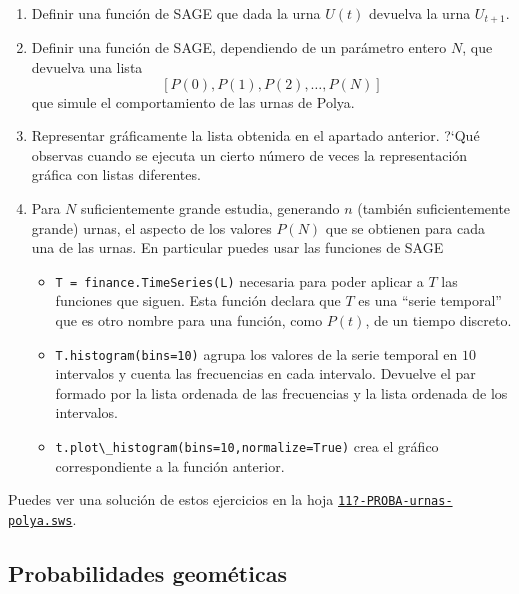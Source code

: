\begin{ejer}
\begin{enumerate}
 \item Definir una funci\'on de SAGE que dada la urna $U(t)$ devuelva la urna
$U_{t+1}$.
 
 \item Definir una funci\'on de SAGE, dependiendo de un par\'ametro entero $N$, 
que devuelva una lista 
 \[[P(0),P(1),P(2),\dots,P(N)]\]
 \noindent que simule el comportamiento de las urnas de
Polya.
 
 \item Representar gr\'aficamente la lista obtenida en el apartado anterior.
?`Qu\'e observas cuando se ejecuta un cierto n\'umero de veces  la
representaci\'on gr\'afica con listas diferentes.

\item Para $N$ suficientemente grande estudia, generando $n$ (tambi\'en
suficientemente grande) urnas,  el aspecto de los valores $P(N)$ que se obtienen
para cada una de las urnas.  En particular puedes usar las funciones de SAGE
\begin{itemize}
 \item \lstinline|T = finance.TimeSeries(L)| necesaria para poder aplicar a $T$
las
funciones que siguen. Esta funci\'on declara que $T$ es una ``serie temporal''
que es otro nombre para una funci\'on, como $P(t)$, de un tiempo discreto.
\item \lstinline|T.histogram(bins=10)| agrupa los valores de la serie temporal
en $10$
intervalos y cuenta las frecuencias en cada intervalo. Devuelve 
el par formado por la lista ordenada de las frecuencias y la lista ordenada de
los intervalos.
\item \lstinline|t.plot\_histogram(bins=10,normalize=True)| crea el gr\'afico
correspondiente a la funci\'on anterior.
\end{itemize}
\end{enumerate}
\end{ejer}


Puedes ver una soluci\'on de estos ejercicios  en la hoja 
 \href{http://sage.mat.uam.es:8888/home/pub/??/}{\tt 11?-PROBA-urnas-polya.sws}.
 




\subsection{Probabilidades geom\'eticas}

